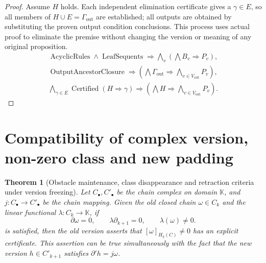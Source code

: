 \documentclass[12pt,a4paper,openany,notitlepage]{report}
\theoremstyle{plain}
\newtheorem{theorem}{Theorem}[chapter]
\theoremstyle{definition}
\theoremstyle{remark}
\begin{document}
\begin{CJK*}
\begin{proof}
Assume $H$ holds. Each independent elimination certificate gives a $\gamma\in E$, so all members of $H\cup E=\Gamma_{\mathrm{out}}$ are established; all outputs are obtained by substituting the proven output condition conclusions. This process uses actual proof to eliminate the premise without changing the version or meaning of any original proposition. \[
\begin{gathered}
 \operatorname{AcyclicRules}\land\operatorname{LeafSequents}
 \Rightarrow\bigwedge_v\left(\bigwedge B_v\Rightarrow P_v\right),\\
 \operatorname{OutputAncestorClosure}
 \Rightarrow\left(\bigwedge\Gamma_{\mathrm{out}}
 \Rightarrow\bigwedge_{v\in V_{\mathrm{out}}}P_v\right),\\
 \bigwedge_{\gamma\in E}\operatorname{Certified}(H\Rightarrow\gamma)
 \Rightarrow\left(\bigwedge H\Rightarrow
             \bigwedge_{v\in V_{\mathrm{out}}}P_v\right).
\end{gathered}
\]\end{proof}


\section { Compatibility of complex version, non-zero class and new padding }\label{exp:gov:homology-version-section}


\begin{theorem}
[Obstacle maintenance, class disappearance and retraction criteria under version freezing]\label{exp:gov:homology-version}
Let $C_\bullet,C'_\bullet$ be the chain complex on domain $\mathbb K$, and $j:C_\bullet\to C'_\bullet$ be the chain mapping. Given the old closed chain $\omega\in C_k$ and the linear functional $\lambda:C_k\to\mathbb K$, if \[
 \partial\omega=0,\qquad
 \lambda\partial_{k+1}=0,\qquad\lambda(\omega)\ne0.
\] is satisfied, then the old version asserts that $[\omega]_{H_k(C)}\ne0$ has an explicit certificate. This assertion can be true simultaneously with the fact that the new version $h\in C'_{k+1}$ satisfies $\partial'h=j\omega$.


\end{theorem}
\end{CJK*}
\end{document}
